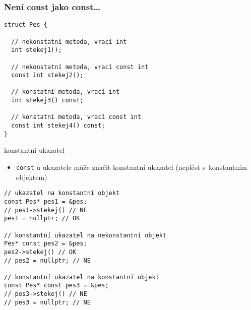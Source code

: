 \begin{frame}[fragile]
\frametitle{Není const jako const\ldots}
\begin{yesblock}
\begin{lstlisting}
struct Pes {

  // nekonstatní metoda, vrací int
  int stekej1();

  // nekonstatní metoda, vrací const int
  const int stekej2();

  // konstatní metoda, vrací int
  int stekej3() const;

  // konstatní metoda, vrací const int
  const int stekej4() const;
}
\end{lstlisting}
\end{yesblock}
\end{frame}



\begin{frame}[fragile]
\begin{bonusblock}{konstantní ukazatel}
\begin{itemize}
\item \lstinline|const| u ukazatele může značit konstantní ukazatel (neplést s~konstantním objektem)
\end{itemize}
\end{bonusblock}

\begin{bonusblock}{}
\begin{lstlisting}[basicstyle=\small]
// ukazatel na konstantní objekt
const Pes* pes1 = &pes;
// pes1->stekej() // NE
pes1 = nullptr; // OK

// konstantní ukazatel na nekonstantní objekt
Pes* const pes2 = &pes;
pes2->stekej() // OK
// pes2 = nullptr; // NE

// konstantní ukazatel na konstantní objekt
const Pes* const pes3 = &pes;
// pes3->stekej() // NE
// pes3 = nullptr; // NE
\end{lstlisting}
\end{bonusblock}
\end{frame}









